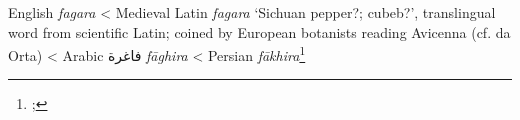 \begin{etymology}\label{ety:fagara}
English \textit{fagara}
< Medieval Latin \textit{fagara} `Sichuan pepper?; cubeb?', translingual word from scientific Latin; coined by European botanists reading Avicenna (cf. da Orta)
< Arabic {فاغرة} \textit{fāghira}
< Persian \textit{fākhira}\footnote{; }
\end{etymology}